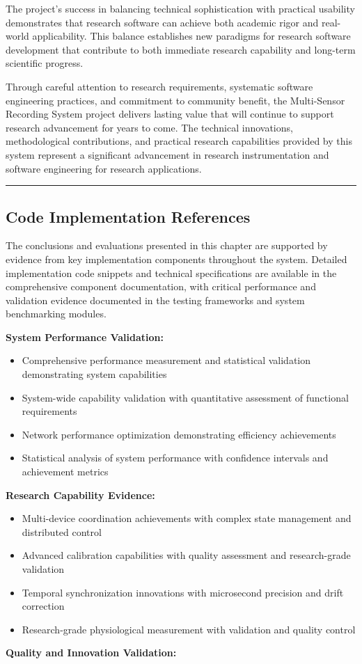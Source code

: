 \documentclass[12pt,a4paper]{article}
\begin{document}
The project's success in balancing technical sophistication with practical usability demonstrates that research software
can achieve both academic rigor and real-world applicability. This balance establishes new paradigms for research
software development that contribute to both immediate research capability and long-term scientific progress.

Through careful attention to research requirements, systematic software engineering practices, and commitment to
community benefit, the Multi-Sensor Recording System project delivers lasting value that will continue to support
research advancement for years to come. The technical innovations, methodological contributions, and practical research
capabilities provided by this system represent a significant advancement in research instrumentation and software
engineering for research applications.

\hrule

\subsection{Code Implementation References}

The conclusions and evaluations presented in this chapter are supported by evidence from key implementation components
throughout the system. Detailed implementation code snippets and technical specifications are available in the
comprehensive component documentation, with critical performance and validation evidence documented in the testing
frameworks and system benchmarking modules.

\textbf{System Performance Validation:}

\begin{itemize}
\item Comprehensive performance measurement and statistical validation demonstrating system capabilities
\item System-wide capability validation with quantitative assessment of functional requirements
\item Network performance optimization demonstrating efficiency achievements
\item Statistical analysis of system performance with confidence intervals and achievement metrics

\end{itemize}
\textbf{Research Capability Evidence:}

\begin{itemize}
\item Multi-device coordination achievements with complex state management and distributed control
\item Advanced calibration capabilities with quality assessment and research-grade validation
\item Temporal synchronization innovations with microsecond precision and drift correction
\item Research-grade physiological measurement with validation and quality control

\end{itemize}
\textbf{Quality and Innovation Validation:}
\end{document}

